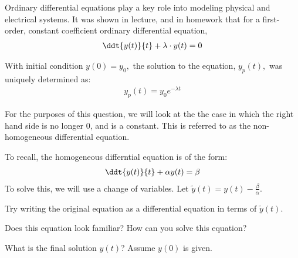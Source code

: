 
Ordinary differential equations play a key role into modeling physical and electrical systems.
It was shown in lecture, and in homework that for a first-order, constant coefficient ordinary differential equation,
\begin{align}
\ddt{y(t)}{t} + \lambda \cdot y(t) = 0
\end{align}

With initial condition $y(0) = y_0,$ the solution to the equation, $y_p(t),$ was uniquely determined as:
\begin{align}
y_p(t) = y_0 e^{-\lambda t}
\end{align}

For the purposes of this question, we will look at the the case in which the right hand side is no longer 0, and is a constant.
This is referred to as the non-homogeneous differential equation.

To recall, the homogeneous differntial equation is of the form:
\begin{align}
    \ddt{y(t)}{t} + \alpha y(t) = \beta
\end{align}
To solve this, we will use a change of variables.
Let $\widetilde{y}(t) = y(t) - \frac{\beta}{\alpha}$.

\begin{enumerate}

\qitem Try writing the original equation as a differential 
equation in terms of $\widetilde{y}(t)$.


\qitem Does this equation look familiar? How can you solve this equation?



\qitem What is the final solution $y(t)$? Assume $y(0)$ is given.


\end{enumerate}


